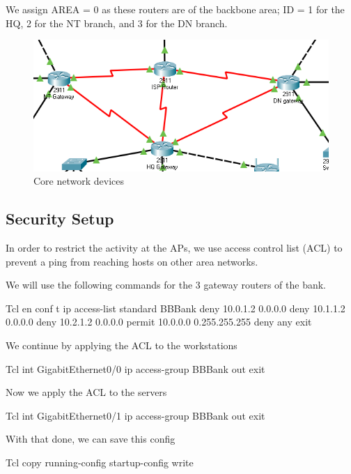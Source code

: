We assign AREA = 0 as these routers are of the backbone area; ID = 1 for the HQ, 2 for the NT branch, and 3 for the DN branch.

\begin{figure}
  \centering
  \includegraphics{./assets/core.png}
  \caption{Core network devices}
\end{figure}

\subsection{Security Setup}
In order to restrict the activity at the APs, we use access control list (ACL) to prevent a ping from reaching hosts on other area networks.

We will use the following commands for the 3 gateway routers of the bank.

\begin{code}{Tcl}
  en
  conf t
  ip access-list standard BBBank
  deny 10.0.1.2 0.0.0.0
  deny 10.1.1.2 0.0.0.0
  deny 10.2.1.2 0.0.0.0
  permit 10.0.0.0 0.255.255.255
  deny any
  exit
\end{code}

We continue by applying the ACL to the workstations

\begin{code}{Tcl}
  int GigabitEthernet0/0
  ip access-group BBBank out
  exit
\end{code}

Now we apply the ACL to the servers

\begin{code}{Tcl}
  int GigabitEthernet0/1
  ip access-group BBBank out
  exit
\end{code}

With that done, we can save this config

\begin{code}{Tcl}
  copy running-config startup-config
  write
\end{code}

